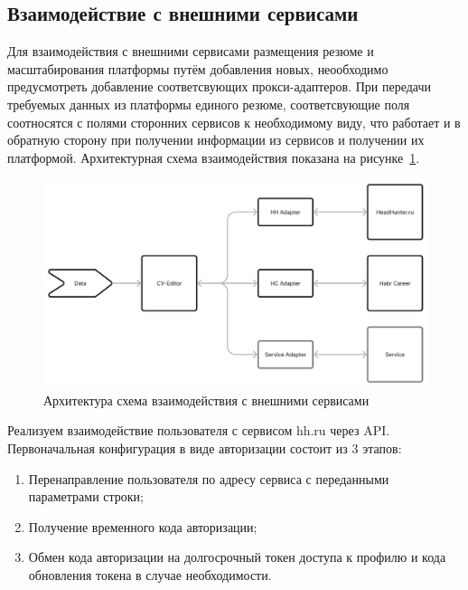 \documentclass[master, och, diploma]{SCWorks}
\begin{document}
\subsection{Взаимодействие с внешними сервисами}
Для взаимодействия с внешними сервисами размещения резюме и масштабирования платформы путём добавления новых, неообходимо предусмотреть добавление соответсвующих прокси-адаптеров. При передачи требуемых данных из платформы единого резюме, соответсвующие поля соотносятся с полями сторонних сервисов к необходимому виду, что работает и в обратную сторону при получении информации из сервисов и получении их платформой. Архитектурная схема взаимодействия показана на рисунке~\ref{fig:33}.  
\begin{figure}[!ht]
    \centering
    \includegraphics[width=14cm]{images/image-architecture.png}
    \caption{\label{fig:33}%
        Архитектура схема взаимодействия с внешними сервисами}
\end{figure}

Реализуем взаимодействие пользователя с сервисом hh.ru через API. Первоначальная конфигурация в виде авторизации состоит из 3 этапов:
\begin{enumerate}
    \item Перенаправление пользователя по адресу сервиса с переданными параметрами строки;
    \item Получение временного кода авторизации;
    \item Обмен кода авторизации на долгосрочный токен доступа к профилю и кода обновления токена в случае необходимости.\cite{hh_api}
\end{enumerate}
\end{document}
